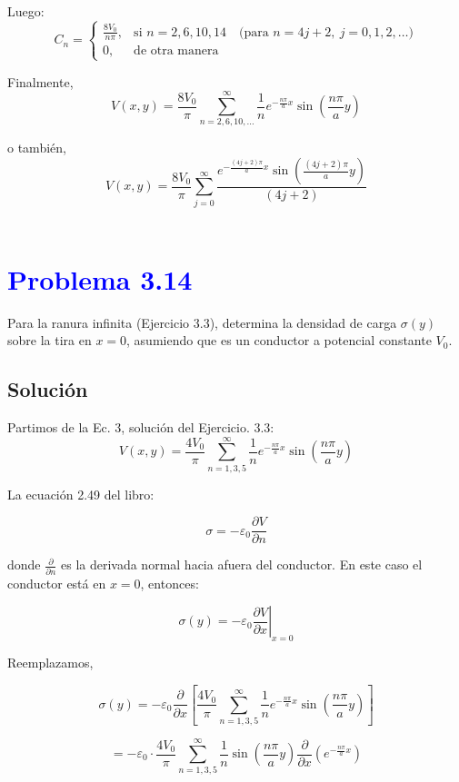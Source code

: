 \documentclass[12pt]{article}
\begin{document}
Luego:
\[
C_n =
\begin{cases}
\frac{8V_0}{n\pi}, & \text{si } n = 2, 6, 10, 14 \quad \text{(para } n = 4j + 2, \ j = 0, 1, 2, \dots) \\
0, & \text{de otra manera}
\end{cases}
\]

Finalmente,
\[
\boxed{V(x,y) = \frac{8V_0}{\pi} \sum_{n=2,6,10,\dots}^{\infty} \frac{1}{n} e^{-\frac{n\pi}{a}x} \sin\left( \frac{n\pi}{a}y \right)}
\]

o también,
\[
\boxed{V(x,y) = \frac{8V_0}{\pi} \sum_{j=0}^{\infty} \frac{e^{-\frac{(4j+2)\pi}{a}x} \sin\left( \frac{(4j+2)\pi}{a}y\right)}{(4j+2)}  }
\]\\


\section*{\textcolor{blue}{Problema 3.14}}

Para la ranura infinita  (Ejercicio 3.3), determina la densidad de carga \( \sigma(y) \) sobre la tira en \( x = 0 \), asumiendo que es un conductor a potencial constante \( V_0 \).

\subsection*{Solución}

Partimos de la Ec. 3, solución del Ejercicio. 3.3:
\[
V(x,y) = \frac{4V_0}{\pi} \sum_{n=1,3,5}^{\infty} \frac{1}{n} e^{-\frac{n\pi}{a}x} \sin\left( \frac{n\pi}{a}y \right)
\]

La ecuación 2.49 del libro:

\[
\sigma = -\varepsilon_0 \frac{\partial V}{\partial n}
\]

donde \( \frac{\partial}{\partial n} \) es la derivada normal hacia afuera del conductor. En este caso el conductor está en \( x = 0 \), entonces:

\[
\sigma(y) = -\varepsilon_0 \left. \frac{\partial V}{\partial x} \right|_{x=0}
\]

Reemplazamos,

\[
\sigma(y) = -\varepsilon_0 \frac{\partial}{\partial x} \left[ \frac{4V_0}{\pi} \sum_{n=1,3,5}^\infty \frac{1}{n} e^{-\frac{n\pi}{a}x} \sin\left( \frac{n\pi}{a} y \right) \right]
\]

\[
= -\varepsilon_0 \cdot \frac{4V_0}{\pi} \sum_{n=1,3,5}^\infty \frac{1}{n} \sin\left( \frac{n\pi}{a} y \right) \frac{\partial}{\partial x} \left( e^{-\frac{n\pi}{a}x} \right)
\]
\end{document}
